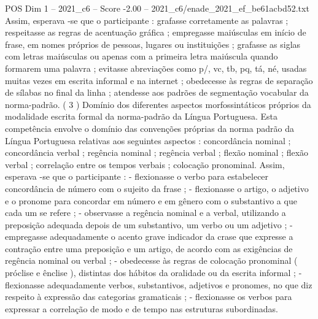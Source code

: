 \begin{textsample}{POS Dim 1 – 2021\_c6 – Score -2.00 – 2021\_c6/enade\_2021\_ef\_be61acbd52.txt}
Assim, esperava -se que o participante : grafasse corretamente as palavras ; respeitasse as regras de acentuação gráfica ; empregasse maiúsculas em início de frase, em nomes próprios de pessoas, lugares ou instituições ; grafasse as siglas com letras maiúsculas ou apenas com a primeira letra maiúscula quando formarem uma palavra ; evitasse abreviações como p/, vc, tb, pq, tá, né, usadas muitas vezes em escrita informal e na internet ; obedecesse às regras de separação de sílabas no final da linha ; atendesse aos padrões de segmentação vocabular da norma-padrão. ( 3 ) Domínio dos diferentes aspectos morfossintáticos próprios da modalidade escrita formal da norma-padrão da Língua Portuguesa.
Esta competência envolve o domínio das convenções próprias da norma padrão da Língua Portuguesa relativas aos seguintes aspectos : concordância nominal ; concordância verbal ; regência nominal ; regência verbal ; flexão nominal ; flexão verbal ; correlação entre os tempos verbais ; colocação pronominal.
Assim, esperava -se que o participante : - flexionasse o verbo para estabelecer concordância de número com o sujeito da frase ; - flexionasse o artigo, o adjetivo e o pronome para concordar em número e em gênero com o substantivo a que cada um se refere ; - observasse a regência nominal e a verbal, utilizando a preposição adequada depois de um substantivo, um verbo ou um adjetivo ; - empregasse adequadamente o acento grave indicador da crase que expresse a contração entre uma preposição e um artigo, de acordo com as exigências de regência nominal ou verbal ; - obedecesse às regras de colocação pronominal ( próclise e ênclise ), distintas dos hábitos da oralidade ou da escrita informal ; - flexionasse adequadamente verbos, substantivos, adjetivos e pronomes, no que diz respeito à expressão das categorias gramaticais ; - flexionasse os verbos para expressar a correlação de modo e de tempo nas estruturas subordinadas.

\end{textsample}
